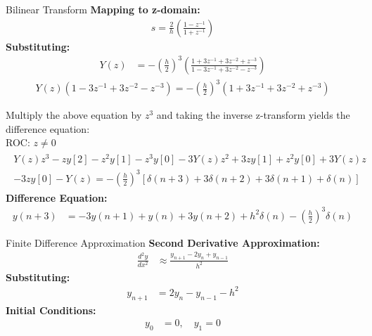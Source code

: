 \documentclass{beamer}
\begin{document}
\begin{frame}{Bilinear Transform}
	\textbf{Mapping to z-domain:}
	\begin{align}
		s = \frac{2}{h} \left(\frac{1 - z^{-1}}{1 + z^{-1}} \right)
	\end{align}
	\textbf{Substituting:}
	\begin{align}
		Y(z) &= -\left(\frac{h}{2}\right)^3 \left(\frac{1 + 3z^{-1} + 3z^{-2} + z^{-3}}{1 - 3z^{-1} + 3z^{-2} - z^{-3}} \right)
	\end{align}
	\begin{align}
	        Y(z)\left(1 - 3z^{-1} + 3z^{-2} - z^{-3}\right) = -\left(\frac{h}{2}\right)^3 \left(1 + 3z^{-1} + 3z^{-2} + z^{-3}\right)
	\end{align}
\end{frame}

\begin{frame}
        Multiply the above equation by $z^3$ and taking the inverse z-transform yields the difference equation: \\
	ROC: $z \neq 0$ \\
	\begin{align}
		\begin{split}
		Y(z)z^3 - zy[2] - z^2y[1] - z^3y[0] - 3Y(z)z^2 + 3zy[1] + z^2y[0] + 3Y(z)z \\- 3zy[0] - Y(z) = -\left(\frac{h}{2}\right)^3[\delta(n+3) + 3\delta(n+2) + 3\delta(n+1) + \delta(n)]
		\end{split}	
	\end{align}
        \textbf{Difference Equation:}
	\begin{align}
		y(n+3) &= -3y(n+1) + y(n) + 3y(n+2) + h^2\delta(n) - \left(\frac{h}{2}\right)^3\delta(n)
	\end{align}
\end{frame}

\begin{frame}{Finite Difference Approximation}
	\textbf{Second Derivative Approximation:}
	\begin{align}
		\frac{d^2y}{dx^2} &\approx \frac{y_{n+1} - 2y_n + y_{n-1}}{h^2}
	\end{align}
	\textbf{Substituting:}
	\begin{align}
		y_{n+1} &= 2y_n - y_{n-1} - h^2
	\end{align}
	\textbf{Initial Conditions:}
	\begin{align}
		y_0 &= 0, \quad y_1 = 0
	\end{align}
\end{frame}
\end{document}

